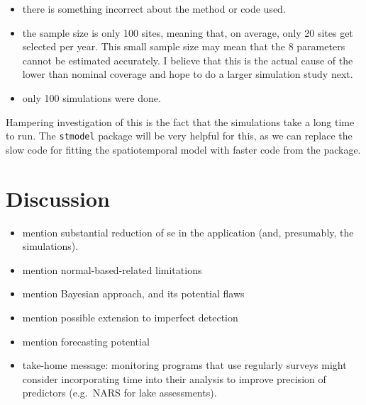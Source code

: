 \documentclass[]{interact}
\theoremstyle{plain}%
\theoremstyle{definition}
\theoremstyle{remark}
\def\tightlist{}
\begin{document}
\begin{itemize}
\tightlist
\item
  there is something incorrect about the method or code used.
\item
  the sample size is only 100 sites, meaning that, on average, only 20
  sites get selected per year. This small sample size may mean that the
  8 parameters cannot be estimated accurately. I believe that this is
  the actual cause of the lower than nominal coverage and hope to do a
  larger simulation study next.
\item
  only 100 simulations were done.
\end{itemize}

Hampering investigation of this is the fact that the simulations take a
long time to run. The \texttt{stmodel} package will be very helpful for
this, as we can replace the slow code for fitting the spatiotemporal
model with faster code from the package.

\section{Discussion} \label{section:Discussion}

\begin{itemize}
\item
  mention substantial reduction of se in the application (and,
  presumably, the simulations).
\item
  mention normal-based-related limitations
\item
  mention Bayesian approach, and its potential flaws
\item
  mention possible extension to imperfect detection
\item
  mention forecasting potential
\item
  take-home message: monitoring programs that use regularly surveys
  might consider incorporating time into their analysis to improve
  precision of predictors (e.g.~NARS for lake assessments).
\end{itemize}



\end{document}
